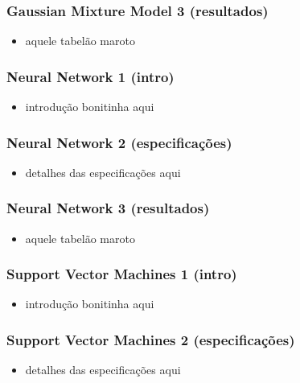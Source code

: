 \documentclass{beamer}
\begin{document}
\begin{frame}

	\frametitle{Gaussian Mixture Model 3 (resultados)}
	
	\begin{itemize}	
		\item aquele tabelão maroto
	\end{itemize}
	
\end{frame}


\begin{frame}

	\frametitle{Neural Network 1 (intro)}
	
	\begin{itemize}	
		\item introdução bonitinha aqui
	\end{itemize}
	
\end{frame}


\begin{frame}

	\frametitle{Neural Network 2 (especificações)}
	
	\begin{itemize}	
		\item detalhes das especificações aqui
	\end{itemize}
	
\end{frame}


\begin{frame}

	\frametitle{Neural Network 3 (resultados)}
	
	\begin{itemize}	
		\item aquele tabelão maroto
	\end{itemize}
	
\end{frame}


\begin{frame}

	\frametitle{Support Vector Machines 1 (intro)}
	
	\begin{itemize}	
		\item introdução bonitinha aqui
	\end{itemize}
	
\end{frame}


\begin{frame}

	\frametitle{Support Vector Machines 2 (especificações)}
	
	\begin{itemize}	
		\item detalhes das especificações aqui
	\end{itemize}
	
\end{frame}
\end{document}
